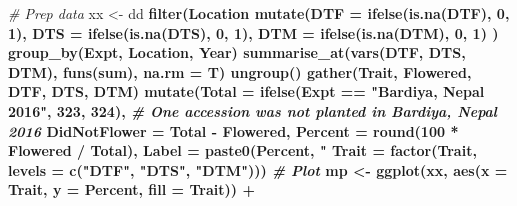 \documentclass[
]{article}
\newenvironment{Shaded}{\begin{snugshade}}{\end{snugshade}}
\newcommand{\CommentTok}[1]{\textcolor[rgb]{0.56,0.35,0.01}{\textit{#1}}}
\newcommand{\DataTypeTok}[1]{\textcolor[rgb]{0.13,0.29,0.53}{#1}}
\newcommand{\DecValTok}[1]{\textcolor[rgb]{0.00,0.00,0.81}{#1}}
\newcommand{\KeywordTok}[1]{\textcolor[rgb]{0.13,0.29,0.53}{\textbf{#1}}}
\newcommand{\NormalTok}[1]{#1}
\newcommand{\OperatorTok}[1]{\textcolor[rgb]{0.81,0.36,0.00}{\textbf{#1}}}
\newcommand{\StringTok}[1]{\textcolor[rgb]{0.31,0.60,0.02}{#1}}
\begin{document}
\begin{Shaded}
\begin{Highlighting}[]
\CommentTok{# Prep data}
\NormalTok{xx <-}\StringTok{ }\NormalTok{dd }\OperatorTok{%
\StringTok{  }\KeywordTok{filter}\NormalTok{(Location }\OperatorTok{%
\StringTok{  }\KeywordTok{mutate}\NormalTok{(}\DataTypeTok{DTF =} \KeywordTok{ifelse}\NormalTok{(}\KeywordTok{is.na}\NormalTok{(DTF), }\DecValTok{0}\NormalTok{, }\DecValTok{1}\NormalTok{),}
         \DataTypeTok{DTS =} \KeywordTok{ifelse}\NormalTok{(}\KeywordTok{is.na}\NormalTok{(DTS), }\DecValTok{0}\NormalTok{, }\DecValTok{1}\NormalTok{),}
         \DataTypeTok{DTM =} \KeywordTok{ifelse}\NormalTok{(}\KeywordTok{is.na}\NormalTok{(DTM), }\DecValTok{0}\NormalTok{, }\DecValTok{1}\NormalTok{) ) }\OperatorTok{%
\StringTok{  }\KeywordTok{group_by}\NormalTok{(Expt, Location, Year) }\OperatorTok{%
\StringTok{  }\KeywordTok{summarise_at}\NormalTok{(}\KeywordTok{vars}\NormalTok{(DTF, DTS, DTM), }\KeywordTok{funs}\NormalTok{(sum), }\DataTypeTok{na.rm =}\NormalTok{ T) }\OperatorTok{%
\StringTok{  }\KeywordTok{ungroup}\NormalTok{() }\OperatorTok{%
\StringTok{  }\KeywordTok{gather}\NormalTok{(Trait, Flowered, DTF, DTS, DTM) }\OperatorTok{%
\StringTok{  }\KeywordTok{mutate}\NormalTok{(}\DataTypeTok{Total =} \KeywordTok{ifelse}\NormalTok{(Expt }\OperatorTok{==}\StringTok{ "Bardiya, Nepal 2016"}\NormalTok{, }\DecValTok{323}\NormalTok{, }\DecValTok{324}\NormalTok{),}
         \CommentTok{# One accession was not planted in Bardiya, Nepal 2016}
         \DataTypeTok{DidNotFlower =}\NormalTok{ Total }\OperatorTok{-}\StringTok{ }\NormalTok{Flowered,}
         \DataTypeTok{Percent =} \KeywordTok{round}\NormalTok{(}\DecValTok{100} \OperatorTok{*}\StringTok{ }\NormalTok{Flowered }\OperatorTok{/}\StringTok{ }\NormalTok{Total),}
         \DataTypeTok{Label =} \KeywordTok{paste0}\NormalTok{(Percent, }\StringTok{"%
         \DataTypeTok{Trait =} \KeywordTok{factor}\NormalTok{(Trait, }\DataTypeTok{levels =} \KeywordTok{c}\NormalTok{(}\StringTok{"DTF"}\NormalTok{, }\StringTok{"DTS"}\NormalTok{, }\StringTok{"DTM"}\NormalTok{)))}
\CommentTok{# Plot}
\NormalTok{mp <-}\StringTok{ }\KeywordTok{ggplot}\NormalTok{(xx, }\KeywordTok{aes}\NormalTok{(}\DataTypeTok{x =}\NormalTok{ Trait, }\DataTypeTok{y =}\NormalTok{ Percent, }\DataTypeTok{fill =}\NormalTok{ Trait)) }\OperatorTok{+}\StringTok{ }
}}}}}}}}
\end{Highlighting}
\end{Shaded}
\end{document}
